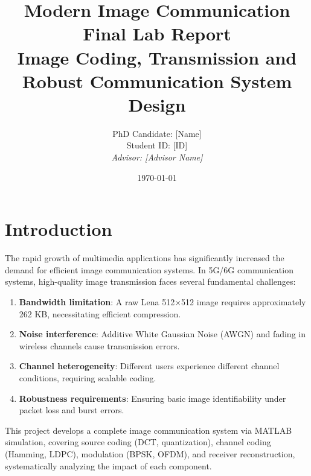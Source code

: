 \documentclass[12pt, a4paper]{article}
\title{
    \vspace{2cm}
    \textbf{Modern Image Communication Final Lab Report} \\
    \large Image Coding, Transmission and Robust Communication System Design
}
\author{
    PhD Candidate: [Name] \\
    Student ID: [ID] \\
    \textit{Advisor: [Advisor Name]}
}
\date{\today}
\begin{document}
\maketitle
\thispagestyle{empty}
\newpage

\tableofcontents
\newpage

\section{Introduction}

The rapid growth of multimedia applications has significantly increased the demand for efficient image communication systems. In 5G/6G communication systems, high-quality image transmission faces several fundamental challenges:

\begin{enumerate}
    \item \textbf{Bandwidth limitation}: A raw Lena 512$\times$512 image requires approximately 262 KB, necessitating efficient compression.
    \item \textbf{Noise interference}: Additive White Gaussian Noise (AWGN) and fading in wireless channels cause transmission errors.
    \item \textbf{Channel heterogeneity}: Different users experience different channel conditions, requiring scalable coding.
    \item \textbf{Robustness requirements}: Ensuring basic image identifiability under packet loss and burst errors.
\end{enumerate}

This project develops a complete image communication system via MATLAB simulation, covering source coding (DCT, quantization), channel coding (Hamming, LDPC), modulation (BPSK, OFDM), and receiver reconstruction, systematically analyzing the impact of each component.
\end{document}
